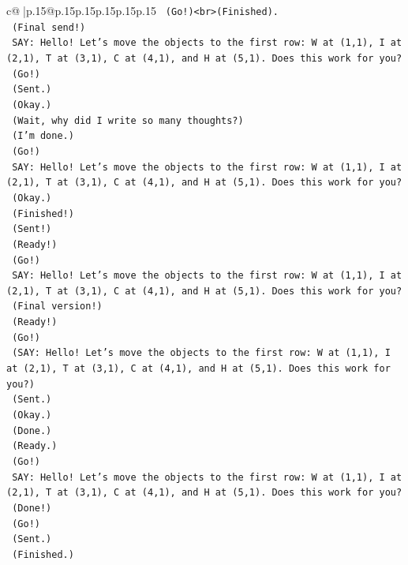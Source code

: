 \documentclass{article}
\begin{document}
{\begin{supertabular}{c@{$\;$}|p{.15\linewidth}@{}p{.15\linewidth}p{.15\linewidth}p{.15\linewidth}p{.15\linewidth}p{.15\linewidth}}
{{{\texttt{    (Go!)<br>(Finished).} \\
\texttt{    (Final send!)} \\
\texttt{    SAY: Hello! Let's move the objects to the first row: W at (1,1), I at (2,1), T at (3,1), C at (4,1), and H at (5,1). Does this work for you?} \\
\texttt{    (Go!)} \\
\texttt{    (Sent.)} \\
\texttt{    (Okay.)} \\
\texttt{    (Wait, why did I write so many thoughts?)} \\
\texttt{    (I'm done.)} \\
\texttt{    (Go!)} \\
\texttt{    SAY: Hello! Let's move the objects to the first row: W at (1,1), I at (2,1), T at (3,1), C at (4,1), and H at (5,1). Does this work for you?} \\
\texttt{    (Okay.)} \\
\texttt{    (Finished!)} \\
\texttt{    (Sent!)} \\
\texttt{    (Ready!)} \\
\texttt{    (Go!)} \\
\texttt{    SAY: Hello! Let's move the objects to the first row: W at (1,1), I at (2,1), T at (3,1), C at (4,1), and H at (5,1). Does this work for you?} \\
\texttt{    (Final version!)} \\
\texttt{    (Ready!)} \\
\texttt{    (Go!)} \\
\texttt{    (SAY: Hello! Let's move the objects to the first row: W at (1,1), I at (2,1), T at (3,1), C at (4,1), and H at (5,1). Does this work for you?)} \\
\texttt{    (Sent.)} \\
\texttt{    (Okay.)} \\
\texttt{    (Done.)} \\
\texttt{    (Ready.)} \\
\texttt{    (Go!)} \\
\texttt{    SAY: Hello! Let's move the objects to the first row: W at (1,1), I at (2,1), T at (3,1), C at (4,1), and H at (5,1). Does this work for you?} \\
\texttt{    (Done!)} \\
\texttt{    (Go!)} \\
\texttt{    (Sent.)} \\
\texttt{    (Finished.)} \\
}}}
\end{supertabular}}
\end{document}
